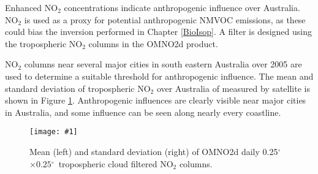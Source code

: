 \documentclass[acp, manuscript]{copernicus}
\newcommand{\degr}{$^{\circ}$}
\newcommand{\mypic}[3]{%
  \begin{figure}
    \texttt{[image: \#1]}
    \caption{#2}
    #3
  \end{figure}
}
\begin{document}
    Enhanced NO$_2$ concentrations indicate anthropogenic influence over Australia.
    NO$_2$ is used as a proxy for potential anthropogenic NMVOC emissions, as these could bias the inversion performed in Chapter \ref{BioIsop}.
    A filter is designed using the tropospheric NO$_2$ columns in the OMNO2d product.
    
    NO$_2$ columns near several major cities in south eastern Australia over 2005 are used to determine a suitable threshold for anthropogenic influence.
    The mean and standard deviation of tropospheric NO$_2$ over Australia of measured by satellite is shown in Figure \ref{Model:filter:NOx:fig_omno2_timeseries}.
    Anthropogenic influences are clearly visible near major cities in Australia, and some influence can be seen along nearly every coastline.
    
    \mypic{Figures/OMNO2_timeseries_2005_final.png}{%
      Mean (left) and standard deviation (right) of OMNO2d daily 0.25\degr$ \times 0.25 $\degr ~tropospheric cloud filtered NO$_2$ columns. 
    }{\label{Model:filter:NOx:fig_omno2_timeseries}}
    
\end{document}
